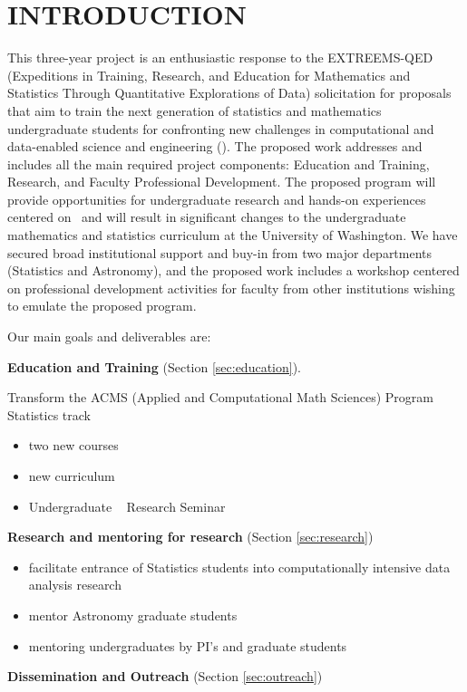 \section{ INTRODUCTION}

This three-year project is an enthusiastic response to the EXTREEMS-QED (Expeditions in Training, Research, 
and Education for Mathematics and Statistics Through Quantitative Explorations of Data) solicitation for proposals
that aim to train the next generation of statistics and mathematics undergraduate students for confronting new
challenges in computational and data-enabled science and engineering (\cdse).  The proposed work addresses and 
includes all the main required project components: Education and Training, Research, and Faculty Professional 
Development. The proposed program will provide opportunities for undergraduate research and hands-on experiences 
centered on \cdse\ and will result in significant changes to the undergraduate mathematics and statistics curriculum 
at the University of Washington. We have secured broad institutional support and buy-in from two major departments 
(Statistics and Astronomy), and the proposed work includes a workshop centered on professional development activities
for faculty from other institutions wishing to emulate the proposed program. 

\vskip 0.2in Our main goals and deliverables are: 
\bits
\item {\bf Education and Training} (Section \ref{sec:education}).

Transform the ACMS (Applied and Computational Math Sciences) Program Statistics track
\begin{itemize}
  \item two new courses
  \item new curriculum 
  \item Undergraduate \cdse~ Research Seminar
  \end{itemize}
\item {\bf Research and mentoring for research} (Section \ref{sec:research})
\begin{itemize}
  \item facilitate entrance of Statistics students into computationally intensive data analysis research
  \item mentor Astronomy graduate students 
  \item mentoring undergraduates by PI's and graduate students
  \end{itemize}
\item {\bf Dissemination and Outreach} (Section \ref{sec:outreach})

